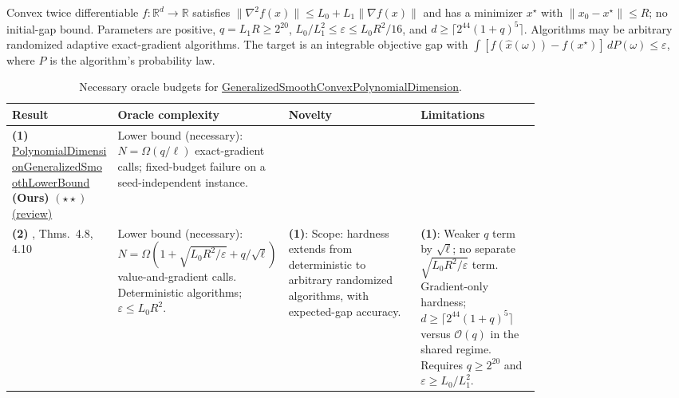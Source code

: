 \begin{table}[tp]
\centering
\caption{Necessary oracle budgets for \href{https://github.com/k3nfalt/longtails/blob/main/LongTails/Setups/GeneralizedSmoothConvexPolynomialDimension.lean}{GeneralizedSmoothConvexPolynomialDimension}.}\label{tab:GeneralizedSmoothConvexPolynomialDimension}
\parbox{\linewidth}{\footnotesize Convex twice differentiable $f:\mathbb{R}^d\to\mathbb{R}$ satisfies $\|\nabla^2 f(x)\|\le L_0+L_1\|\nabla f(x)\|$ and has a minimizer $x^\star$ with $\|x_0-x^\star\|\le R$; no initial-gap bound. Parameters are positive, $q=L_1R\ge 2^{20}$, $L_0/L_1^2\le\varepsilon\le L_0R^2/16$, and $d\ge\lceil 2^{44}(1+q)^5\rceil$. Algorithms may be arbitrary randomized adaptive exact-gradient algorithms. The target is an integrable objective gap with $\int [f(\hat x(\omega))-f(x^\star)]\,dP(\omega)\le\varepsilon$, where $P$ is the algorithm's probability law.}\par\smallskip
\begin{threeparttable}
\footnotesize
\setlength{\tabcolsep}{4pt}\renewcommand{\arraystretch}{1.25}
\begin{tabularx}{\linewidth}{@{}>{\raggedright\arraybackslash}p{0.20\linewidth}>{\raggedright\arraybackslash}p{0.32\linewidth}>{\raggedright\arraybackslash}p{0.25\linewidth}>{\raggedright\arraybackslash}X@{}}
\toprule
\textbf{Result} & \textbf{Oracle complexity} & \textbf{Novelty} & \textbf{Limitations} \\
\midrule
\textbf{(1)} \href{https://github.com/k3nfalt/longtails/blob/main/LongTails/Theorems/PolynomialDimensionGeneralizedSmoothLowerBound.lean}{Polynomial\allowbreak Dimension\allowbreak Generalized\allowbreak Smooth\allowbreak Lower\allowbreak Bound} \textbf{(Ours)} $(\star\star)$ \href{https://github.com/k3nfalt/longtails/blob/main/scripts/reviews/PolynomialDimensionGeneralizedSmoothLowerBound.md}{(review)}
& Lower bound (necessary): $N=\Omega(q/\ell)$ exact-gradient calls; fixed-budget failure on a seed-independent instance. & & \\
\midrule[1.2pt]
\textbf{(2)} \citep{mirrorEverestV2}, Thms.~4.8, 4.10
& Lower bound (necessary): $N=\Omega\!\left(1+\sqrt{L_0R^2/\varepsilon}+q/\sqrt{\ell}\right)$ value-and-gradient calls. Deterministic algorithms; $\varepsilon\le L_0R^2$.
& \textbf{(1)}: Scope: hardness extends from deterministic to arbitrary randomized algorithms, with expected-gap accuracy.
& \textbf{(1)}: Weaker $q$ term by $\sqrt{\ell}$; no separate $\sqrt{L_0R^2/\varepsilon}$ term. Gradient-only hardness; $d\ge\lceil2^{44}(1+q)^5\rceil$ versus $\mathcal{O}(q)$ in the shared regime. Requires $q\ge2^{20}$ and $\varepsilon\ge L_0/L_1^2$. \\

\end{tabularx}
\end{threeparttable}
\end{table}
